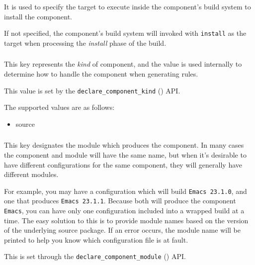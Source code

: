 It is used to specify the target to execute inside the component's
build system to install the component.

If not specified, the component's build system will invoked with
\texttt{install} as the target when processing the \emph{install}
phase of the build.

\subsubsection{}

This key represents the \emph{kind} of component, and the value is
used internally to determine how to handle the component when
generating rules.

This value is set by the \texttt{declare\_component\_kind}
() API.

The supported values are as follows:

\begin{itemize}
\item source
\end{itemize}

\subsubsection{}

This key designates the module which produces the component.  In many
cases the component and module will have the same name, but when it's
desirable to have different configurations for the same component,
they will generally have different modules.

For example, you may have a configuration which will build
\texttt{Emacs 23.1.0}, and one that produces \texttt{Emacs 23.1.1}.
Because both will produce the component \texttt{Emacs}, you can have
only one configuration included into a wrapped build at a time.  The
easy solution to this is to provide module names based on the version
of the underlying source package.
If an error occurs, the module name will be printed to help you know
which configuration file is at fault.

This is set through the \texttt{declare\_component\_module}
() API.

\subsubsection{}

